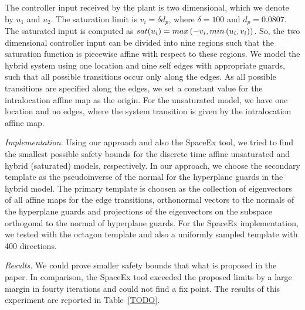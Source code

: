 The controller input received by the plant is two dimensional, which
we denote by $u_1$ and $u_2$.  The saturation limit is $v_i=\delta
d_p$, where $\delta=100$ and $d_p=0.0807$.  The saturated input is
computed as $sat(u_i) = max\left(-v_i,min\left(u_i,v_i\right)\right)$.  So, the
two dimensional controller input can be divided into nine regions such
that the saturation function is piecewise affine with respect to these
regions.  We model the hybrid system using one location and nine self
edges with appropriate guards, such that all possible transitions
occur only along the edges.  As all possible transitions are specified
along the edges, we set a constant value for the intralocation affine
map as the origin.  For the unsaturated model, we have one location
and no edges, where the system transition is given by the
intralocation affine map.
\vspace{0.2em}

\emph{Implementation.}  Using our approach and also the SpaceEx tool,
we tried to find the smallest possible safety bounds for the discrete
time affine unsaturated and hybrid (saturated) models, respectively.
In our approach, we choose the secondary template as the pseudoinverse
of the normal for the hyperplane guards in the hybrid model.  The
primary template is choosen as the collection of eigenvectors of all
affine maps for the edge transitions, orthonormal vectors to the
normals of the hyperplane guards and projections of the eigenvectors
on the subspace orthogonal to the normal of hyperplane guards.  For
the SpaceEx implementation, we tested with the octagon template and
also a uniformly sampled template with 400 directions.

\emph{Results.}  We could prove smaller safety bounds that what is
proposed in the paper.  In comparison, the SpaceEx tool exceeded the
proposed limits by a large margin in fourty iterations and could not
find a fix point.  The results of this experiment are reported in
Table~\ref{TODO}.


